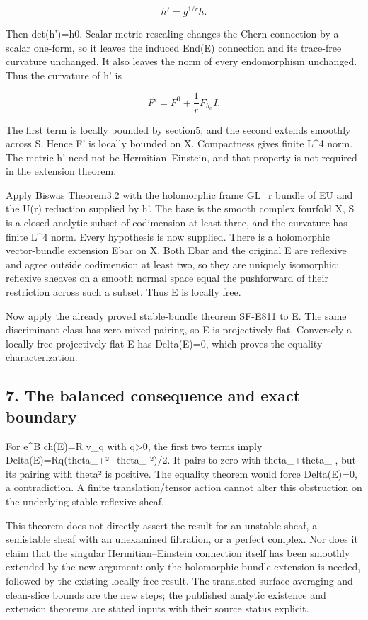 \[
 h'=g^{1/r}h.
 \tag{E834.13}
\]

Then det(h')=h0. Scalar metric rescaling changes the Chern connection by
a scalar one-form, so it leaves the induced End(E) connection and its
trace-free curvature unchanged. It also leaves the norm of every
endomorphism unchanged. Thus the curvature of h' is

\[
 F'=F^0+\frac1rF_{h_0}I.
 \tag{E834.14}
\]

The first term is locally bounded by section5, and the second extends
smoothly across S. Hence F' is locally bounded on X. Compactness gives
finite L\^{}4 norm. The metric h' need not be Hermitian--Einstein, and
that property is not required in the extension theorem.

Apply Biswas Theorem3.2 with the holomorphic frame GL\_r bundle of
E\textbar U and the U(r) reduction supplied by h'. The base is the
smooth complex fourfold X, S is a closed analytic subset of codimension
at least three, and the curvature has finite L\^{}4 norm. Every
hypothesis is now supplied. There is a holomorphic vector-bundle
extension Ebar on X. Both Ebar and the original E are reflexive and
agree outside codimension at least two, so they are uniquely isomorphic:
reflexive sheaves on a smooth normal space equal the pushforward of
their restriction across such a subset. Thus E is locally free.

Now apply the already proved stable-bundle theorem SF-E811 to E. The
same discriminant class has zero mixed pairing, so E is projectively
flat. Conversely a locally free projectively flat E has Delta(E)=0,
which proves the equality characterization.

\subsection{7. The balanced consequence and exact
boundary}\label{SF-E834:the-balanced-consequence-and-exact-boundary}

For e\^{}B ch(E)=R v\_q with q\textgreater0, the first two terms imply
Delta(E)=Rq(theta\_+²+theta\_-²)/2. It pairs to zero with
theta\_+theta\_-, but its pairing with theta² is positive. The equality
theorem would force Delta(E)=0, a contradiction. A finite
translation/tensor action cannot alter this obstruction on the
underlying stable reflexive sheaf.

This theorem does not directly assert the result for an unstable sheaf,
a semistable sheaf with an unexamined filtration, or a perfect complex.
Nor does it claim that the singular Hermitian--Einstein connection
itself has been smoothly extended by the new argument: only the
holomorphic bundle extension is needed, followed by the existing locally
free result. The translated-surface averaging and clean-slice bounds are
the new steps; the published analytic existence and extension theorems
are stated inputs with their source status explicit.

